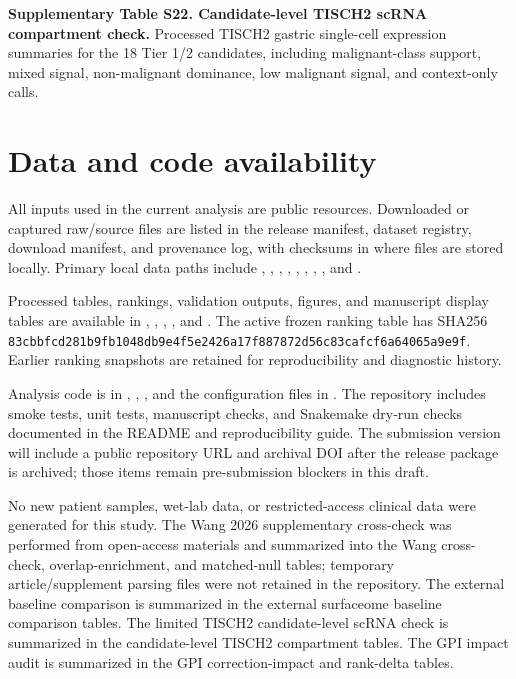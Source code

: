 \documentclass[twocolumn]{article}
\begin{document}
\textbf{Supplementary Table S22. Candidate-level TISCH2 scRNA compartment check.} Processed TISCH2 gastric single-cell expression summaries for the 18 Tier 1/\allowbreak{}2 candidates, including malignant-class support, mixed signal, non-malignant dominance, low malignant signal, and context-only calls.

\section*{Data and code availability}

All inputs used in the current analysis are public resources. Downloaded or captured raw/\allowbreak{}source files are listed in the release manifest, dataset registry, download manifest, and provenance log, with checksums in  where files are stored locally. Primary local data paths include , , , , , , , , and .

Processed tables, rankings, validation outputs, figures, and manuscript display tables are available in , , , , and . The active frozen ranking table has SHA256 \texttt{83cb\allowbreak{}bfcd\allowbreak{}281b\allowbreak{}9fb1\allowbreak{}048d\allowbreak{}b9e4\allowbreak{}f5e2\allowbreak{}426a\allowbreak{}17f8\allowbreak{}8787\allowbreak{}2d56\allowbreak{}c83c\allowbreak{}afcf\allowbreak{}6a64\allowbreak{}065a\allowbreak{}9e9f}. Earlier ranking snapshots are retained for reproducibility and diagnostic history.

Analysis code is in , , , and the configuration files in . The repository includes smoke tests, unit tests, manuscript checks, and Snakemake dry-run checks documented in the README and reproducibility guide. The submission version will include a public repository URL and archival DOI after the release package is archived; those items remain pre-submission blockers in this draft.

No new patient samples, wet-lab data, or restricted-access clinical data were generated for this study. The Wang 2026 supplementary cross-check was performed from open-access materials and summarized into the Wang cross-check, overlap-enrichment, and matched-null tables; temporary article/\allowbreak{}supplement parsing files were not retained in the repository. The external baseline comparison is summarized in the external surfaceome baseline comparison tables. The limited TISCH2 candidate-level scRNA check is summarized in the candidate-level TISCH2 compartment tables. The GPI impact audit is summarized in the GPI correction-impact and rank-delta tables.
\end{document}
